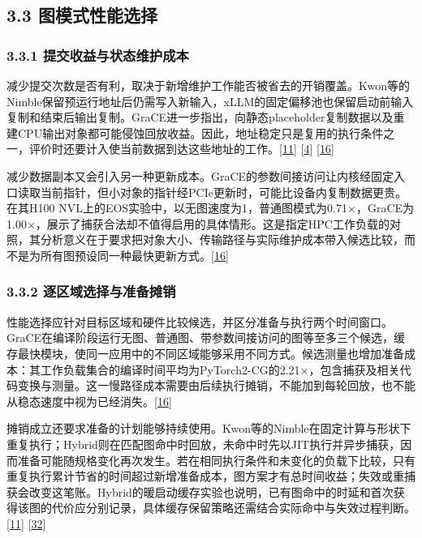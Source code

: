 \documentclass[
  11pt,
  UTF8]{ctexart}
\begin{document}
\hypertarget{section-3-3}{%
\subsection{3.3 图模式性能选择}\label{section-3-3}}

\hypertarget{section-3-3-1}{%
\subsubsection{3.3.1 提交收益与状态维护成本}\label{section-3-3-1}}

减少提交次数是否有利，取决于新增维护工作能否被省去的开销覆盖。Kwon等的Nimble保留预运行地址后仍需写入新输入，xLLM的固定偏移池也保留启动前输入复制和结束后输出复制。GraCE进一步指出，向静态placeholder复制数据以及重建CPU输出对象都可能侵蚀回放收益。因此，地址稳定只是复用的执行条件之一，评价时还要计入使当前数据到达这些地址的工作。{[}\protect\hyperlink{ref-kwon2020nimble}{11}{]}
{[}\protect\hyperlink{ref-liu2025xllm}{4}{]}
{[}\protect\hyperlink{ref-ghosh2026grace}{16}{]}

减少数据副本又会引入另一种更新成本。GraCE的参数间接访问让内核经固定入口读取当前指针，但小对象的指针经PCIe更新时，可能比设备内复制数据更贵。在其H100
NVL上的EOS实验中，以无图速度为1，普通图模式为0.71×，GraCE为1.00×，展示了捕获合法却不值得启用的具体情形。这是指定HPC工作负载的对照，其分析意义在于要求把对象大小、传输路径与实际维护成本带入候选比较，而不是为所有图预设同一种最快更新方式。{[}\protect\hyperlink{ref-ghosh2026grace}{16}{]}

\hypertarget{section-3-3-2}{%
\subsubsection{3.3.2 逐区域选择与准备摊销}\label{section-3-3-2}}

性能选择应针对目标区域和硬件比较候选，并区分准备与执行两个时间窗口。GraCE在编译阶段运行无图、普通图、带参数间接访问的图等至多三个候选，缓存最快模块，使同一应用中的不同区域能够采用不同方式。候选测量也增加准备成本：其工作负载集合的编译时间平均为PyTorch2-CG的2.21×，包含捕获及相关代码变换与测量。这一慢路径成本需要由后续执行摊销，不能加到每轮回放，也不能从稳态速度中视为已经消失。{[}\protect\hyperlink{ref-ghosh2026grace}{16}{]}

摊销成立还要求准备的计划能够持续使用。Kwon等的Nimble在固定计算与形状下重复执行；Hybrid则在匹配图命中时回放，未命中时先以JIT执行并异步捕获，因而准备可能随规格变化再次发生。若在相同执行条件和未变化的负载下比较，只有重复执行累计节省的时间超过新增准备成本，图方案才有总时间收益；失效或重捕获会改变这笔账。Hybrid的暖启动缓存实验也说明，已有图命中的时延和首次获得该图的代价应分别记录，具体缓存保留策略还需结合实际命中与失效过程判断。{[}\protect\hyperlink{ref-kwon2020nimble}{11}{]}
{[}\protect\hyperlink{ref-yadav2026hybridpreprint}{32}{]}
\end{document}
